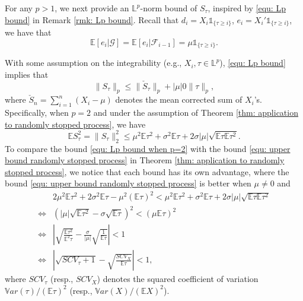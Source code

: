 \documentclass[ECP]{ejpecp} %
\newcommand{\F}{\mathcal{F}}
\newcommand{\G}{\mathcal{G}}
\newcommand{\lpar}{\left(}
\newcommand{\rpar}{\right)}
\newcommand{\E}{\mathbb{E}}
\newcommand{\one}{\mathds{1}}
\newcommand{\sumn}{\sum\limits_{i=1}^n}
\begin{document}
\begin{remark}
    For any $p>1$, we next provide an $\mathbb L^p$-norm bound of $S_\tau$, inspired by \eqref{equ: Lp bound} in Remark \ref{rmk: Lp bound}. Recall that $d_i = X_i \one_{\{\tau \geq i\}}$, $e_i = X_i' \one_{\{\tau \geq i\}}$, we have that \[\E[e_i | \G] = \E[e_i | \F_{i-1}] = \mu \one_{\{\tau \geq i\}}.\]

    With some assumption on the integrability (e.g., $X_i,\tau \in \mathbb L^p$), \eqref{equ: Lp bound} implies that
    \begin{equation}
        \label{equ: Lp bound for randomly stopped time}
        \| S_\tau \|_p \leq \| \check S_\tau \|_p + |\mu|0 \|\tau \|_p,
    \end{equation}
    where $\check S_n = \sumn (X_i - \mu)$ denotes the mean corrected sum of $X_i$'s. Specifically, when $p=2$ and under the assumption of Theorem \ref{thm: application to randomly stopped process}, we have
    \begin{equation}
    \label{equ: Lp bound when p=2}
        \E S^2_\tau = \| S_\tau \|_2^2 \leq \mu^2 \mathbb E\tau^2 + \sigma^2 \mathbb E \tau + 2\sigma |\mu| \sqrt{\mathbb E \tau \mathbb E \tau^2}.
    \end{equation}
    To compare the bound \eqref{equ: Lp bound when p=2} with the bound \eqref{equ: upper bound randomly stopped process} in Theorem \ref{thm: application to randomly stopped process}, we notice that each bound has its own advantage, where the bound \eqref{equ: upper bound randomly stopped process} is better when $\mu \neq 0$ and 
    \begin{align*}
        & 2 \mu^2 \mathbb E\tau^2 + 2\sigma^2 \mathbb E \tau - \mu^2 (\mathbb E \tau)^2 < \mu^2 \mathbb E\tau^2 + \sigma^2 \mathbb E \tau + 2\sigma |\mu| \sqrt{\mathbb E \tau \mathbb E \tau^2}\\
        \Leftrightarrow&  \lpar  |\mu| \sqrt{\mathbb E\tau^2} - \sigma \sqrt{\mathbb E \tau} \rpar^2 < (\mu \mathbb E \tau)^2 \\
         \Leftrightarrow& \left | \sqrt{\frac{\E \tau^2}{\E^2 \tau} } -  \frac{\sigma}{|\mu|}\sqrt{\frac{1}{\E \tau} }  \right | < 1 \\
        \Leftrightarrow & \left | \sqrt{SCV_\tau +1 } -  \sqrt{\frac{SCV_X}{\E \tau}}  \right | < 1,
    \end{align*}
    where $SCV_\tau$ (resp., $SCV_X$) denotes the squared coefficient of variation $\mathbb Var(\tau)/(\mathbb E \tau)^2$ (resp., $\mathbb Var(X)/(\mathbb E X)^2$). %
\end{remark}
    
\end{document}
